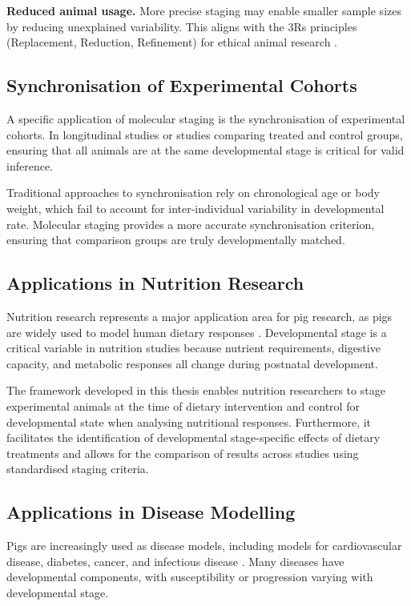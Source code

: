 \textbf{Reduced animal usage.} More precise staging may enable smaller sample sizes by reducing unexplained variability. This aligns with the 3Rs principles (Replacement, Reduction, Refinement) for ethical animal research \parencite{kirk_recovering_2018}.

\subsection{Synchronisation of Experimental Cohorts}

A specific application of molecular staging is the synchronisation of experimental cohorts. In longitudinal studies or studies comparing treated and control groups, ensuring that all animals are at the same developmental stage is critical for valid inference.

Traditional approaches to synchronisation rely on chronological age or body weight, which fail to account for inter-individual variability in developmental rate. Molecular staging provides a more accurate synchronisation criterion, ensuring that comparison groups are truly developmentally matched.

\subsection{Applications in Nutrition Research}

Nutrition research represents a major application area for pig research, as pigs are widely used to model human dietary responses \parencite{lunney_importance_2021}. Developmental stage is a critical variable in nutrition studies because nutrient requirements, digestive capacity, and metabolic responses all change during postnatal development.

The framework developed in this thesis enables nutrition researchers to stage experimental animals at the time of dietary intervention and control for developmental state when analysing nutritional responses. Furthermore, it facilitates the identification of developmental stage-specific effects of dietary treatments and allows for the comparison of results across studies using standardised staging criteria.

\subsection{Applications in Disease Modelling}

Pigs are increasingly used as disease models, including models for cardiovascular disease, diabetes, cancer, and infectious disease \parencite{meurens_pig_2012, swindle_swine_2012}. Many diseases have developmental components, with susceptibility or progression varying with developmental stage.

